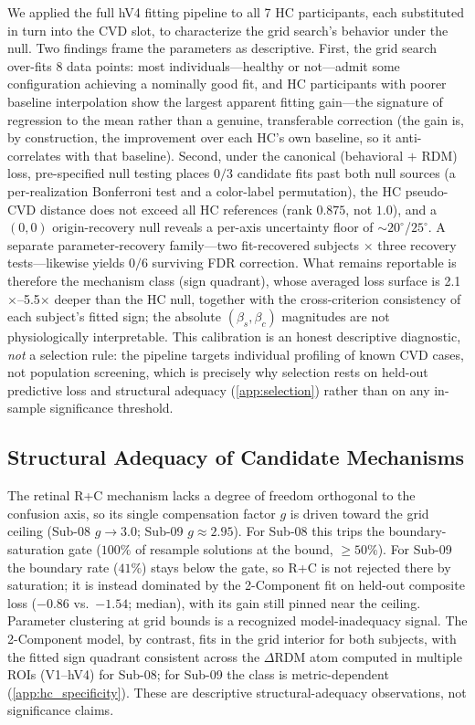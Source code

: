 \documentclass{article}
\begin{document}
We applied the full hV4 fitting pipeline to all 7 HC participants, each substituted in turn into the CVD slot, to characterize the grid search's behavior under the null.
Two findings frame the parameters as descriptive.
First, the grid search over-fits 8 data points: most individuals---healthy or not---admit some configuration achieving a nominally good fit, and HC participants with poorer baseline interpolation show the largest apparent fitting gain---the signature of regression to the mean rather than a genuine, transferable correction (the gain is, by construction, the improvement over each HC's own baseline, so it anti-correlates with that baseline).
Second, under the canonical (behavioral $+$ RDM) loss, pre-specified null testing places $0/3$ candidate fits past both null sources (a per-realization Bonferroni test and a color-label permutation), the HC pseudo-CVD distance does not exceed all HC references (rank $0.875$, not $1.0$), and a $(0,0)$ origin-recovery null reveals a per-axis uncertainty floor of ${\sim}20^\circ$/$25^\circ$. A separate parameter-recovery family---two fit-recovered subjects $\times$ three recovery tests---likewise yields $0/6$ surviving FDR correction.
What remains reportable is therefore the mechanism class (sign quadrant), whose averaged loss surface is 2.1$\times$--5.5$\times$ deeper than the HC null, together with the cross-criterion consistency of each subject's fitted sign; the absolute $(\beta_s, \beta_c)$ magnitudes are not physiologically interpretable.
This calibration is an honest descriptive diagnostic, \emph{not} a selection rule: the pipeline targets individual profiling of known CVD cases, not population screening, which is precisely why selection rests on held-out predictive loss and structural adequacy (\cref{app:selection}) rather than on any in-sample significance threshold.

\subsection{Structural Adequacy of Candidate Mechanisms}
\label{app:adequacy}

The retinal R+C mechanism lacks a degree of freedom orthogonal to the confusion axis, so its single compensation factor $g$ is driven toward the grid ceiling (Sub-08 $g{\to}3.0$; Sub-09 $g{\approx}2.95$). For Sub-08 this trips the boundary-saturation gate ($100\%$ of resample solutions at the bound, $\geq 50\%$). For Sub-09 the boundary rate ($41\%$) stays below the gate, so R+C is not rejected there by saturation; it is instead dominated by the 2-Component fit on held-out composite loss ($-0.86$ vs.\ $-1.54$; median), with its gain still pinned near the ceiling. Parameter clustering at grid bounds is a recognized model-inadequacy signal.
The 2-Component model, by contrast, fits in the grid interior for both subjects, with the fitted sign quadrant consistent across the $\Delta$RDM atom computed in multiple ROIs (V1--hV4) for Sub-08; for Sub-09 the class is metric-dependent (\cref{app:hc_specificity}).
These are descriptive structural-adequacy observations, not significance claims.
\end{document}
